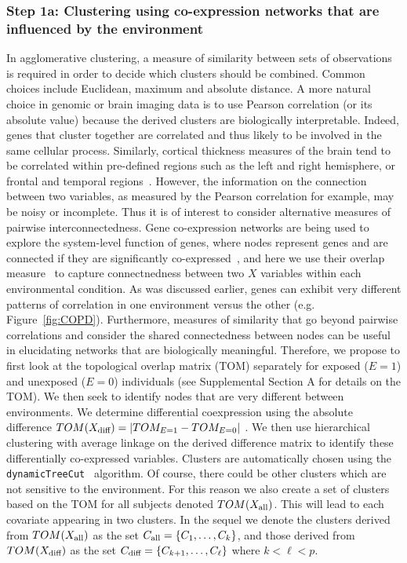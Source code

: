 \subsubsection{Step 1a: Clustering using co-expression networks that are influenced by the environment}
In agglomerative clustering, a measure of similarity between sets of observations is required in order to decide which clusters should be combined. Common choices include Euclidean, maximum and absolute distance. A more natural choice in genomic or brain imaging data is to use Pearson correlation (or its absolute value) because the derived clusters are biologically interpretable. Indeed, genes that cluster together are correlated and thus likely to be involved in the same cellular process. Similarly, cortical thickness measures of the brain tend to be correlated within pre-defined regions such as the left and right hemisphere, or frontal and temporal regions~\citep{sato2013inter}. However, the information on the connection between two variables, as measured by the Pearson correlation for example, may be noisy or incomplete. Thus it is of interest to consider alternative measures of pairwise interconnectedness. Gene co-expression networks are being used to explore the system-level function of genes, where nodes represent genes and are connected if they are significantly co-expressed~\citep{zhang2005general}, and here we use their overlap measure~\citep{ravasz2002hierarchical} to capture connectnedness between two $X$ variables within each environmental condition. As was discussed earlier, genes can exhibit very different patterns of correlation in one environment versus the other (e.g. Figure~\ref{fig:COPD}). Furthermore, measures of similarity that go beyond pairwise correlations and consider the shared connectedness between nodes can be useful in elucidating networks that are biologically meaningful. Therefore, we propose to first look at the topological overlap matrix (TOM) separately for exposed ($E=1$) and unexposed ($E=0$) individuals (see Supplemental Section A for details on the TOM). We then seek to identify nodes that are very different between environments. We determine differential coexpression using the absolute difference $TOM(X_{\textrm{{diff}}}) = |TOM_{E=1} - TOM_{E=0}|$ \citep{klein2016gene}. We then use hierarchical clustering with average linkage on the derived difference matrix to identify these differentially co-expressed variables. Clusters are automatically chosen using the \texttt{dynamicTreeCut}~\citep{langfelder2008defining} algorithm. Of course, there could be other clusters which are not sensitive to the environment. For this reason we also create a set of clusters based on the TOM for all subjects denoted $TOM(X_{\textrm{{all}}})$. This will lead to each covariate appearing in two clusters. In the sequel we denote the clusters derived from $TOM(X_{\textrm{{all}}})$ as the set \mbox{$C_{\textrm{{all}}} = \left\lbrace C_1, \ldots, C_k\right\rbrace$}, and those derived from $TOM(X_{\textrm{{diff}}})$ as the set $C_{\textrm{{diff}}} = \left\lbrace C_{k+1}, \ldots, C_{\ell}\right\rbrace$ where $k < \ell < p$.  

